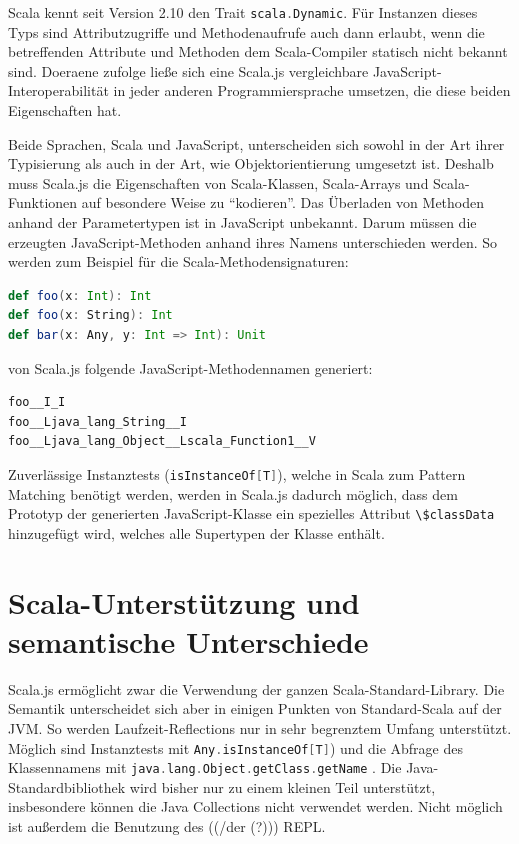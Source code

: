 \documentclass[a4paper, 12pt, hidelinks, listof=totoc, listoftables=totoc, bibliography=totoc]{scrreprt}
\newcommand{\code}[1]{\lstinline[language=Scala, style=inline]|#1|}
\newcommand{\scala}[1]{\lstinline[language=Scala, style=inline]|#1|}
\begin{document}
Scala kennt seit Version 2.10 den Trait \scala{scala.Dynamic}. Für Instanzen dieses Typs sind Attributzugriffe und Methodenaufrufe auch dann erlaubt, wenn die betreffenden Attribute und Methoden dem Scala-Compiler statisch nicht bekannt sind. Doeraene zufolge ließe sich eine Scala.js vergleichbare JavaScript-Interoperabilität in jeder anderen Programmiersprache umsetzen, die diese beiden Eigenschaften hat.\cite[S. 3]{doeraene2013.TDI}

Beide Sprachen, Scala und JavaScript, unterscheiden sich sowohl in der Art ihrer Typisierung als auch in der Art, wie Objektorientierung umgesetzt ist. Deshalb muss Scala.js die Eigenschaften von Scala-Klassen, Scala-Arrays und Scala-Funktionen auf besondere Weise zu "`kodieren"'. Das Überladen von Methoden anhand der Parametertypen ist in JavaScript unbekannt. Darum müssen die erzeugten JavaScript-Methoden anhand ihres Namens unterschieden werden. So werden zum Beispiel für die Scala-Methodensignaturen:

\begin{lstlisting}[language=Scala, style=snippet]
def foo(x: Int): Int
def foo(x: String): Int
def bar(x: Any, y: Int => Int): Unit
\end{lstlisting}

von Scala.js folgende JavaScript-Methodennamen generiert:

\begin{lstlisting}[language=JavaScript, style=snippet]
foo__I_I
foo__Ljava_lang_String__I
foo__Ljava_lang_Object__Lscala_Function1__V
\end{lstlisting}

Zuverlässige Instanztests (\scala{isInstanceOf[T]}), welche in Scala zum Pattern Matching benötigt werden, werden in Scala.js dadurch möglich, dass dem Prototyp der generierten JavaScript-Klasse ein spezielles Attribut \code{\$classData} 
hinzugefügt wird, welches alle Supertypen der Klasse enthält. \cite[Vgl.][S. 3 f.]{doeraene2013.TDI}



\section{Scala-Unterstützung und semantische Unterschiede}

Scala.js ermöglicht zwar die Verwendung der ganzen Scala-Standard-Library. Die Semantik unterscheidet sich aber in einigen Punkten von Standard-Scala auf der JVM. So werden Laufzeit-Reflections nur in sehr begrenztem Umfang unterstützt. Möglich sind Instanztests mit \scala{Any.isInstanceOf[T]}) \cite[S. 2 f.]{doeraene2013.TDI} und die Abfrage des Klassennamens mit \scala{java.lang.Object.getClass.getName} \cite{scalajs.DSS}. Die Java-Standardbibliothek wird bisher nur zu einem kleinen Teil unterstützt\cite{doeraene2014.WHB}, insbesondere können die Java Collections nicht verwendet werden. Nicht möglich ist außerdem die Benutzung des ((/der (?))) \ac{REPL}\cite{doeraene2013.CSJ}.
\end{document}
